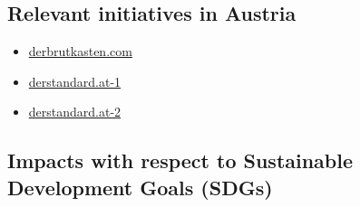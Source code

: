 \documentclass[
]{book}
\providecommand{\tightlist}{%
  \setlength{\itemsep}{0pt}\setlength{\parskip}{0pt}}
\begin{document}
\hypertarget{relevant-initiatives-in-austria-39}{%
\subsection*{Relevant initiatives in Austria}\label{relevant-initiatives-in-austria-39}}

\begin{itemize}
\tightlist
\item
  \href{https://www.derbrutkasten.com/autonome-lufttaxis-linz-ag-facc-ehang/}{derbrutkasten.com}
\item
  \href{https://www.derstandard.at/story/2000103120464/erste-teststrecke-fuer-e-lufttaxis-2020-in-linz}{derstandard.at-1}
\item
  \href{https://www.derstandard.at/story/2000122402408/flugtaxis-wann-kommt-der-tesla-der-luefte}{derstandard.at-2}
\end{itemize}

\hypertarget{impacts-with-respect-to-sustainable-development-goals-sdgs-39}{%
\subsection*{Impacts with respect to Sustainable Development Goals (SDGs)}\label{impacts-with-respect-to-sustainable-development-goals-sdgs-39}}
\end{document}
